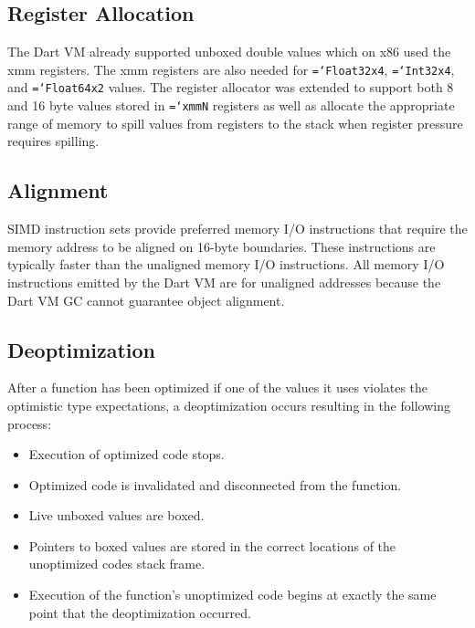 \documentclass[preprint]{sigplanconf}
\newcommand{\ttt}[1]{{\texttt{\hyphenchar\font=`\-\relax #1}}}%
\begin{document}
\subsection{Register Allocation}

The Dart VM already supported unboxed double values which on x86 used the xmm
registers. The xmm registers are also needed for \ttt{Float32x4}, \ttt{Int32x4},
and \ttt{Float64x2} values. The register allocator was extended to support both
8 and 16 byte values stored in \ttt{xmmN} registers as well as allocate the
appropriate range of memory to spill values from registers to the stack when
register pressure requires spilling.

\subsection{Alignment}

SIMD instruction sets provide preferred memory I/O instructions that require the
memory address to be aligned on 16-byte boundaries. These instructions are
typically faster than the unaligned memory I/O instructions. All memory I/O
instructions emitted by the Dart VM are for unaligned addresses because the Dart
VM GC cannot guarantee object alignment.

\subsection{Deoptimization}
\label{deoptimizing}

After a function has been optimized if one of the values it uses violates the
optimistic type expectations, a deoptimization occurs resulting in the following
process:

\begin{itemize}
\item
Execution of optimized code stops.

\item
Optimized code is invalidated and disconnected from the function.

\item
Live unboxed values are boxed.

\item
Pointers to boxed values are stored in the correct locations of the unoptimized
codes stack frame.

\item
Execution of the function's unoptimized code begins at exactly the same point
that the deoptimization occurred.

\end{itemize}
\end{document}
